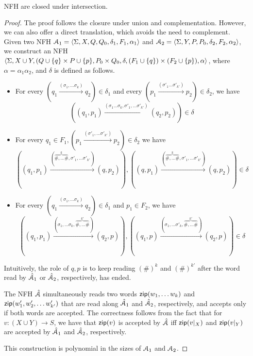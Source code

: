 \begin{theorem}\label{thm:nfh.intersection}
NFH are closed under intersection.
\end{theorem}

\begin{proof}
The proof follows the closure under union and complementation. However, we can also offer a direct translation, which avoids the need to complement. 
Given two NFH $\mathcal{A}_1 = 
\langle \Sigma,X,Q,Q_0,\delta_1,F_1,\alpha_1 \rangle$ and $\mathcal{A}_2= 
\langle \Sigma,Y,P,P_0,\delta_2,F_2,\alpha_2 \rangle$, we construct an NFH $\langle \Sigma,X\cup Y, (Q\cup \{q\} \times P\cup \{p\}, P_0\times Q_0, \delta, (F_1\cup\{q\}) \times (F_2\cup\{p\}), \alpha \rangle$, where 
$\alpha = \alpha_1\alpha_2$, and $\delta$ is defined as follows. 
\begin{itemize}
    \item For every $(q_1\xrightarrow {(\sigma_1,\ldots \sigma_k)} q_2)\in \delta_1$ and every $(p_1\xrightarrow {(\sigma'_1\ldots \sigma'_{k'}) }p_2)\in\delta_2$, we have 
$$((q_1,p_1)\xrightarrow{(\sigma_1\ldots \sigma_k,\sigma'_1,\ldots \sigma'_{k'})} (q_2,p_2))\in\delta$$
\item For every $q_1\in F_1, (p_1 \xrightarrow{(\sigma'_1,\ldots \sigma'_{k'})} p_2)\in \delta_2$ we have $$((q_1,p_1)\xrightarrow {(\overbrace{\#,\ldots\#}^{k},\sigma'_1,\ldots \sigma'_{k'})}(q,p_2)), ((q,p_1)\xrightarrow {(\overbrace{\#,\ldots\#}^{k},\sigma'_1,\ldots \sigma'_{k'})}(q,p_2)) \in \delta$$
\item For every $(q_1\xrightarrow {(\sigma_1,\ldots \sigma_k)} q_2)\in \delta_1$ and $p_1\in F_2$, we have $$((q_1,p_1)\xrightarrow {(\sigma_1,\ldots \sigma_{k},\overbrace{\#,\ldots\#}^{k'})}(q_2,p)),((q_1,p)\xrightarrow {(\sigma_1,\ldots \sigma'_{k},\overbrace{\#,\ldots\#}^{k'})}(q_2,p))\in \delta$$
\end{itemize}

Intuitively, the role of $q,p$ is to keep reading $(\#)^k$ and $(\#)^{k'}$ after the word read by $\hat{\mathcal{A}}_1$ or $\hat{\mathcal{A}}_2$, respectively, has ended. 

The NFH $\hat{\mathcal{A}}$ simultaneously reads two words $\mathsf{zip}(w_1,\ldots w_k)$ and $\mathsf{zip}(w'_1,w'_2,\ldots w'_{k'})$ that are read along $\hat{\mathcal{A}}_1$ and $\hat{\mathcal{A}}_2$, respectively, and accepts only if both words are accepted. The correctness follows from the fact that for $v:(X\cup Y)\rightarrow S$, we have that $\mathsf{zip}(v)$ is accepted by $\hat{\mathcal{A}}$ iff $\mathsf{zip} (v|_X)$ and $\mathsf{zip}(v|_Y)$ are accepted by $\hat{\mathcal{A}}_1$ and $\hat{\mathcal{A}}_2$, respectively. 

This construction is polynomial in the sizes of $\mathcal{A}_1$ and $\mathcal{A}_2$.
\end{proof}



